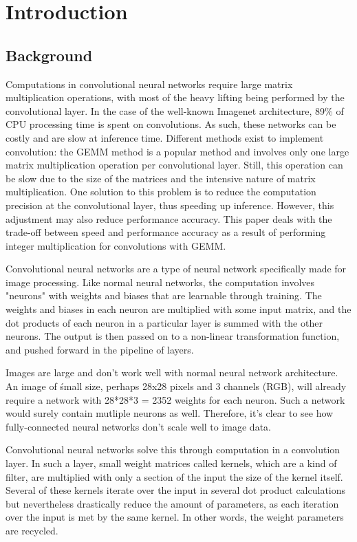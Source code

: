 \chapter{Introduction}

\section{Background}
    

Computations in convolutional neural networks require large matrix multiplication operations, with most of the heavy lifting being performed by the convolutional layer. In the case of the well-known Imagenet architecture, 89\% of CPU processing time is spent on convolutions. As such, these networks can be costly and are slow at inference time. Different methods exist to implement convolution: the GEMM method is a popular method and involves only one large matrix multiplication operation per convolutional layer. Still, this operation can be slow due to the size of the matrices and the intensive nature of matrix multiplication. One solution to this problem is to reduce the computation precision at the convolutional layer, thus speeding up inference. However, this adjustment may also reduce performance accuracy. This paper deals with the trade-off between speed and performance accuracy as a result of performing integer multiplication for convolutions with GEMM.

Convolutional neural networks are a type of neural network specifically made for image processing. Like normal neural networks, the computation involves "neurons" with weights and biases that are learnable through training. The weights and biases in each neuron are multiplied with some input matrix, and the dot products of each neuron in a particular layer is summed with the other neurons. The output is then passed on to a non-linear transformation function, and pushed forward in the pipeline of layers.

Images are large and don't work well with normal neural network architecture. An image of śmall size, perhaps 28x28 pixels and 3 channels (RGB), will already require a network with 28*28*3 = 2352 weights for each neuron. Such a network would surely contain mutliple neurons as well. Therefore, it's clear to see how fully-connected neural networks don't scale well to image data.

Convolutional neural networks solve this through computation in a convolution layer. In such a layer, small weight matrices called kernels, which are a kind of filter, are multiplied with only a section of the input the size of the kernel itself. Several of these kernels iterate over the input in several dot product calculations but nevertheless drastically reduce the amount of parameters, as each iteration over the input is met by the same kernel. In other words, the weight parameters are recycled.

